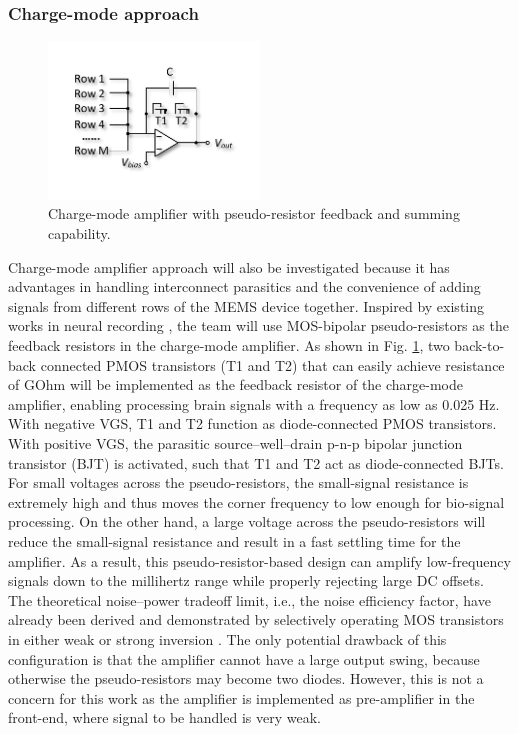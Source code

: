 \subsubsection{Charge-mode approach}

\begin{figure}
\centering
\includegraphics[width=0.5\textwidth]{cmos}
\caption{Charge-mode amplifier with pseudo-resistor feedback and summing capability.}
\label{fig:cmos}
\end{figure}

Charge-mode amplifier approach will also be investigated because it has advantages in handling interconnect parasitics and the convenience of adding signals from different rows of the MEMS device together. Inspired by existing works in neural recording \cite{harrison2003low}, the team will use MOS-bipolar pseudo-resistors as the feedback resistors in the charge-mode amplifier. As shown in Fig. \ref{fig:cmos}, two back-to-back connected PMOS transistors (T1 and T2) that can easily achieve resistance of GOhm will be implemented as the feedback resistor of the charge-mode amplifier, enabling processing brain signals with a frequency as low as 0.025 Hz. With negative VGS, T1 and T2 function as diode-connected PMOS transistors. With positive VGS, the parasitic source–well–drain p-n-p bipolar junction transistor (BJT) is activated, such that T1 and T2 act as diode-connected BJTs. For small voltages across the pseudo-resistors, the small-signal resistance is extremely high and thus moves the corner frequency to low enough for bio-signal processing. On the other hand, a large voltage across the pseudo-resistors will reduce the small-signal resistance and result in a fast settling time for the amplifier. As a result, this pseudo-resistor-based design can amplify low-frequency signals down to the millihertz range while properly rejecting large DC offsets. The theoretical noise–power tradeoff limit, i.e., the noise efficiency factor, have already been derived and demonstrated by selectively operating MOS transistors in either weak or strong inversion \cite{harrison2003low}. The only potential drawback of this configuration is that the amplifier cannot have a large output swing, because otherwise the pseudo-resistors may become two diodes. However, this is not a concern for this work as the amplifier is implemented as pre-amplifier in the front-end, where signal to be handled is very weak.

